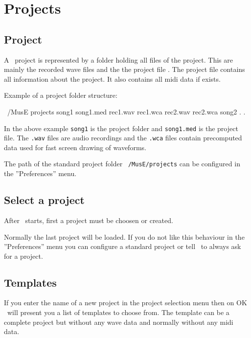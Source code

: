 \chapter{Projects}

  \section{Project}

      A \M\ project  is represented by a folder holding 
      all files of the project. This are mainly the recorded wave files 
      and the the project file .
      The project file contains all information about the project.
      It also contains all midi data if exists.

      Example of a project folder structure:

      \starttyping
      ~/MusE
            projects
                  song1             
                        song1.med
                        rec1.wav
                        rec1.wca
                        rec2.wav
                        rec2.wca
                  song2
                          .             
                          .             
      \stoptyping

      In the above example {\tt song1} is the project folder 
       and
      {\tt song1.med} is the project file. 
      The {\tt *.wav} files are audio recordings and the {\tt *.wca}
      files contain precomputed data used for fast screen drawing of
      waveforms.

      The path of the standard project folder 
        {\tt ~/MusE/projects}
      can be configured in the ''Preferences'' menu.
      

   \section{Select a project}

      After \M\ starts, first a project must be choosen or created.

      Normally the last project will be loaded. If you do not like this
      behaviour in the ''Preferences'' menu you can configure
      a standard project  or tell \M\ to
      always ask for a project.

   \section{Templates}

      If you enter the name of a new project in the project selection
      menu then on OK \M\ will present you a list of templates to
      choose from. The template can be a complete project but 
      without any wave data and normally without any midi data.



